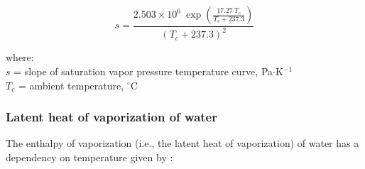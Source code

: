 \begin{equation}
\label{eq:sat}
	s = \frac{2.503\times 10^6\:\exp\left(\frac{17.27\: T_c}{T_c+237.3}\right) }
	              {\left(T_c+237.3\right)^2}
\end{equation}

\noindent where: \\
\indent $s$ = slope of saturation vapor pressure temperature curve, Pa$\cdot$K$^{-1}$ \\
\indent $T_c$ = ambient temperature, $^{\circ}$C \\

\subsubsection{Latent heat of vaporization of water}
\label{sec:latent}
The enthalpy of vaporization (i.e., the latent heat of vaporization) of water has a dependency on temperature given by \parencite[Eq. 8]{henderson84}:

